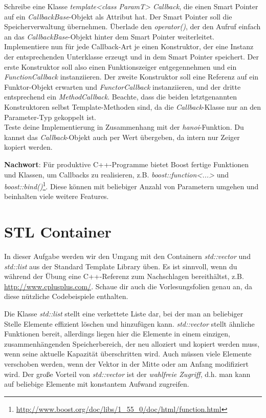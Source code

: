 \begin{enumerate}
Schreibe eine Klasse \emph{template<class ParamT> Callback}, die einen Smart Pointer auf ein \emph{CallbackBase}-Objekt als Attribut hat. Der Smart Pointer soll die Speicherverwaltung übernehmen. Überlade den \emph{operator()}, der den Aufruf einfach an das \emph{CallbackBase}-Objekt hinter dem Smart Pointer weiterleitet. \\

Implementiere nun für jede Callback-Art je einen Konstruktor, der eine Instanz der entsprechenden Unterklasse erzeugt und in dem Smart Pointer speichert.
Der erste Konstruktor soll also einen Funktionszeiger entgegennehmen und ein \emph{FunctionCallback} instanziieren.
Der zweite Konstruktor soll eine Referenz auf ein Funktor-Objekt erwarten und  \emph{FunctorCallback} instanziieren, und der dritte entsprechend ein \emph{MethodCallback}.
Beachte, dass die beiden letztgenannten Konstruktoren selbst Template-Methoden sind, da die \emph{Callback}-Klasse nur an den Parameter-Typ gekoppelt ist.\\

Teste deine Implementierung in Zusammenhang mit der \emph{hanoi}-Funktion. Du kannst das \emph{Callback}-Objekt auch per Wert übergeben, da intern nur Zeiger kopiert werden. 

\end{enumerate}

\textbf{Nachwort}:
Für produktive C++-Programme bietet Boost fertige Funktionen und Klassen, um Callbacks zu realisieren, z.B. \emph{boost::function<...>} und \emph{boost::bind()}\footnote{\url{http://www.boost.org/doc/libs/1_55_0/doc/html/function.html}}. Diese können mit beliebiger Anzahl von Parametern umgehen und beinhalten viele weitere Features.



\section{STL Container} 
In dieser Aufgabe werden wir den Umgang mit den Containern \emph{std::vector} und \emph{std::list} aus der Standard Template Library üben.
Es ist sinnvoll, wenn du während der Übung eine C++-Referenz zum Nachschlagen bereithältst, z.B. \url{http://www.cplusplus.com/}.
Schaue dir auch die Vorlesungsfolien genau an, da diese nützliche Codebeispiele enthalten.

Die Klasse \emph{std::list} stellt eine verkettete Liste dar, bei der man an beliebiger Stelle Elemente effizient löschen und hinzufügen kann. \emph{std::vector} stellt ähnliche Funktionen bereit, allerdings liegen hier die Elemente in einem einzigen, zusammenhängenden Speicherbereich, der neu alloziert und kopiert werden muss, wenn seine aktuelle Kapazität überschritten wird.
Auch müssen viele Elemente verschoben werden, wenn der Vektor in der Mitte oder am Anfang modifiziert wird.
Der große Vorteil von \emph{std::vector} ist der \emph{wahlfreie Zugriff}, d.h. man kann auf beliebige Elemente mit konstantem Aufwand zugreifen.


